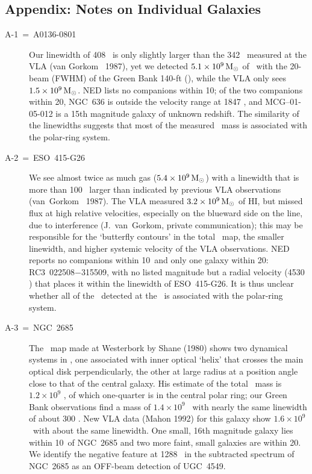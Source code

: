 \vfil\eject

\begin{center}
\section*{Appendix:  Notes on Individual Galaxies}
\end{center}

\noindent

\begin{description}

\item[A-1~=~A0136-0801] 
Our linewidth of 408 \KMS\ is only 
slightly larger than the 342 \KMS\ measured at the VLA 
(van Gorkom \etal\ 1987), yet we detected $5.1 \times 10^9 {\,{\rm M}_\odot}$ of \HI\ 
with the 20\AMIN-beam (FWHM) of the Green Bank 140-ft (), 
while the VLA only sees $1.5 \times 10^9 {\,{\rm M}_\odot}$.   
NED lists no companions within 10\AMIN; of the two companions within
20\AMIN, NGC~636 is outside the velocity range at 1847 \KMS, and
MCG--01-05-012 is a 15th magnitude galaxy of unknown redshift.  
The similarity of the linewidths suggests that most of the 
measured \HI\ mass is associated with the polar-ring system. 

\item[A-2~=~ESO~415-G26] 
We see almost twice as much gas ($5.4 \times
10^9 {\,{\rm M}_\odot}$) with a linewidth that is more than 100 \KMS\ larger than 
indicated by previous VLA observations (van~Gorkom \etal\ 1987).  
The VLA measured $3.2 \times 10^9 {\,{\rm M}_\odot}$ of HI, but missed flux at 
high relative velocities, especially on the blueward side on the line,
due to interference
(J.~van~Gorkom, private communication); this may be responsible for
the `butterfly contours' in the total \HI\ map, the smaller linewidth, and 
higher systemic velocity of the VLA observations.    
NED reports no companions within 10\AMIN\ and only one galaxy within 20\AMIN:
RC3~022508$-$315509, with no listed magnitude but a radial velocity (4530 \KMS) 
that places it within the linewidth of ESO~415-G26.  It is thus
unclear whether all of the \HI\ detected at the \ is associated
with the polar-ring system. 

\item[A-3~=~NGC~2685]
The \HI\ map made at Westerbork by Shane (1980) shows two dynamical
systems in \HI, one associated with inner optical `helix' that crosses
the main optical disk perpendicularly, the other at large radius at a
position angle close to that of the central galaxy.  
His estimate of the total \HI\ mass is $1.2 \times 10^9$ \MSUN, of which
one-quarter is in the central polar ring; our Green Bank observations
find a mass of $1.4 \times 10^9$ \MSUN\ with nearly the same linewidth of about 300 \KMS.  
New VLA data (Mahon 1992) for this galaxy show $1.6 \times 10^9$ \MSUN\
with about the same linewidth. 
One small, 16th magnitude galaxy lies within 10\AMIN\ of NGC~2685 and two more
faint, small galaxies are within 20\AMIN. 
We identify the negative feature at 1288 \KMS\ in the subtracted spectrum 
of NGC~2685 as an OFF-beam detection of UGC~4549.


\end{description}
